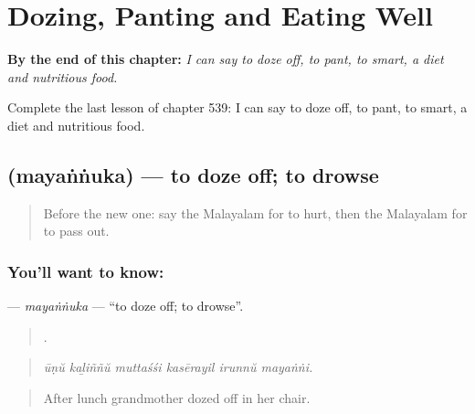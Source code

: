 
\chapter{Dozing, Panting and Eating Well}
\label{ch:ml-dozing-panting-and-eating-well}

\begin{chapteropening}
\textbf{By the end of this chapter:} \emph{I can say to doze off, to pant, to smart, a diet and nutritious food.}

Complete the last lesson of chapter 539: I can say to doze off, to pant, to smart, a diet and nutritious food.
\end{chapteropening}

\section[\texorpdfstring{\ml{മയങ്ങുക} (mayaṅṅuka)}{മയങ്ങുക (mayaṅṅuka)}]{ (mayaṅṅuka) — to doze off; to drowse}

\label{lesson:ML-C539-mayannuka}



\begin{quote}
Before the new one: say the Malayalam for to hurt, then the Malayalam for to pass out.
\end{quote}

\subsection*{You'll want to know: }
\textbf{} — \emph{mayaṅṅuka} — \textquotedblleft{}to doze off; to drowse\textquotedblright{}.

\begin{quote}
     .
\end{quote}

\begin{quote}
\emph{ūṇŭ kaḻiññŭ muttaśśi kasērayil irunnŭ mayaṅṅi.}
\end{quote}

\begin{quote}
After lunch grandmother dozed off in her chair.
\end{quote}

